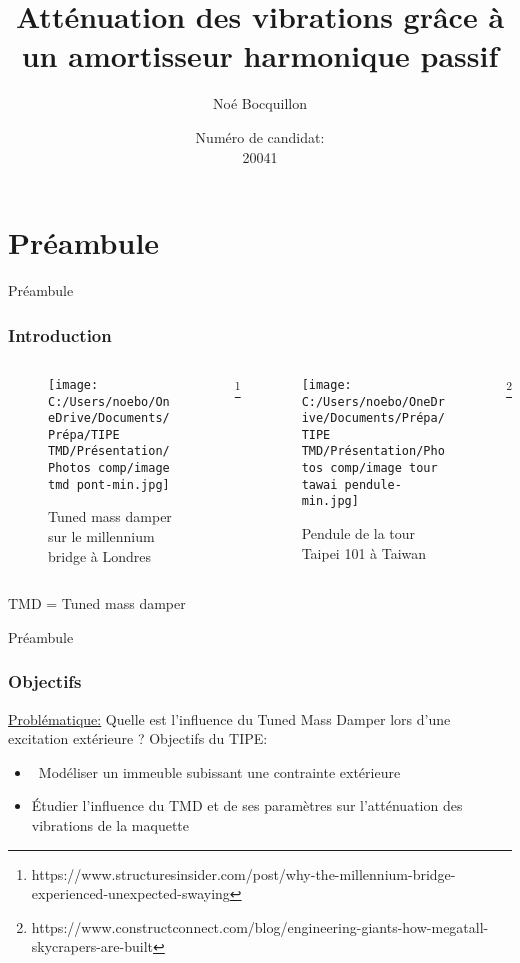 \documentclass{beamer}
\title[]
{Atténuation des vibrations grâce à
	un amortisseur harmonique passif}
\subtitle{}
\author{Noé Bocquillon}
\date[n°20041] %
{Numéro de candidat:\\ 20041}
\begin{document}
	
	\frame{\titlepage}
	\section{Préambule}
	\begin{frame}{Préambule}
		\frametitle{Introduction}
		
		
		\begin{columns}[T]
			\begin{column}{0.46\textwidth}
				\begin{figure}
					\centering
					\texttt{[image: C:/Users/noebo/OneDrive/Documents/Prépa/TIPE TMD/Présentation/Photos comp/image tmd pont-min.jpg]}
					\caption{Tuned mass damper sur le millennium bridge à Londres}
				
				\end{figure}
			
				
			\end{column}
			\footnote{\tiny https://www.structuresinsider.com/post/why-the-millennium-bridge-experienced-unexpected-swaying}
			
			\begin{column}{0.46\textwidth}
				\begin{figure}
					\centering
					\caption{ Pendule de la tour Taipei 101 à Taiwan}					
			
					\texttt{[image: C:/Users/noebo/OneDrive/Documents/Prépa/TIPE TMD/Présentation/Photos comp/image tour tawai pendule-min.jpg]}
				\end{figure}

			\end{column}
			\footnote{\tiny https://www.constructconnect.com/blog/engineering-giants-how-megatall-skycrapers-are-built}
		\end{columns}
		\bigskip\small TMD = Tuned mass damper

	\end{frame}
	
	\begin{frame}{Préambule}
		\frametitle{Objectifs}
		\underline{Problématique:} Quelle est l'influence du Tuned Mass Damper lors d'une excitation extérieure ? 
		\vspace{12pt}
		\linebreak[3]Objectifs du TIPE:
		\begin{itemize}
			\item\ Modéliser un immeuble subissant une contrainte extérieure
			\item Étudier l'influence du TMD et de ses paramètres sur l'atténuation des vibrations de la maquette
			
		\end{itemize}
		
	\end{frame}
	
\end{document}
